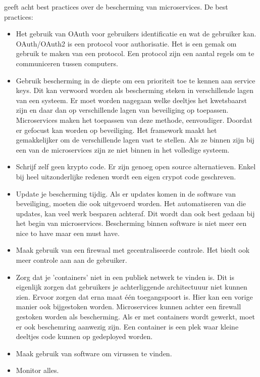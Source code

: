 \textcite{Troisi2019} geeft acht best practices over de bescherming van microservices. 
De best practices:
\begin{itemize}
	\item Het gebruik van OAuth voor gebruikers identificatie en wat de gebruiker kan. OAuth/OAuth2 is een protocol voor authorisatie. Het is een gemak om gebruik te maken van een protocol. Een protocol zijn een aantal regels om te communiceren tussen computers. 
	\item Gebruik bescherming in de diepte om een prioriteit toe te kennen aan service keys.  Dit kan verwoord worden als bescherming steken in verschillende lagen van een systeem. Er moet worden nagegaan welke deeltjes het kwetsbaarst zijn en daar dan op verschillende lagen van beveiliging op toepassen. 
	Microservices maken het toepassen van deze methode, eenvoudiger. Doordat er gefocust kan worden op beveiliging. Het framework maakt het gemakkelijker om de verschillende lagen vast te stellen. Als ze binnen zijn bij een van de microservices zijn ze niet binnen in het volledige systeem. 
	\item Schrijf zelf geen krypto code. Er zijn genoeg open source alternatieven. Enkel bij heel uitzonderlijke redenen wordt een eigen crypot code geschreven. 
	\item Update je bescherming tijdig. Als er updates komen in de software van beveiliging, moeten die ook uitgevoerd worden. Het automatiseren van die updates, kan veel werk besparen achteraf. Dit wordt dan ook best gedaan bij het begin van microservices. Bescherming binnen software is niet meer een nice to have maar een must have. 
	\item Maak gebruik van een firewaal met gecentraliseerde controle. Het biedt ook meer controle aan aan de gebruiker.
	\item Zorg dat je 'containers' niet in een publiek netwerk te vinden is. Dit is eigenlijk zorgen dat gebruikers je achterliggende architectuuur niet kunnen zien. Ervoor zorgen dat erna maat één toegangspoort is.  Hier kan een vorige manier ook bijgestoken worden. Microservices kunnen achter een firewall gestoken worden als bescherming.  Als er met containers wordt gewerkt, moet er ook beschemring aanwezig zijn. Een container is een plek waar kleine deeltjes code kunnen op gedeployed worden. 
	\item Maak gebruik van software om virussen te vinden.
	\item Monitor alles.
\end{itemize}

